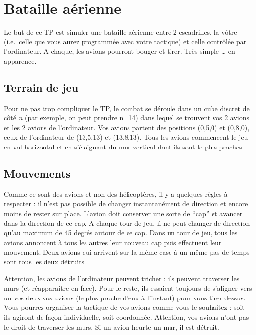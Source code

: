 

\section{Bataille aérienne}\label{bataille-auxe9rienne}

Le but de ce TP est simuler une bataille aérienne entre 2 escadrilles,
la vôtre (i.e.~celle que vous aurez programmée avec votre tactique) et
celle contrôlée par l'ordinateur. A chaque, les avions pourront bouger
et tirer. Très simple \ldots{} en apparence.

\subsection{Terrain de jeu}\label{terrain-de-jeu}

Pour ne pas trop compliquer le TP, le combat se déroule dans un cube
discret de côté \emph{n} (par exemple, on peut prendre n=14) dans lequel
se trouvent vos 2 avions et les 2 avions de l'ordinateur. Vos avions
partent des positions (0,5,0) et (0,8,0), ceux de l'ordinateur de
(13,5,13) et (13,8,13). Tous les avions commencent le jeu en vol
horizontal et en s'éloignant du mur vertical dont ils sont le plus
proches.

\subsection{Mouvements}\label{mouvements}

Comme ce sont des avions et non des hélicoptères, il y a quelques règles à
respecter : il n'est pas possible de changer instantanément de direction
et encore moins de rester sur place. L'avion doit conserver une sorte de
``cap'' et avancer dans la direction de ce cap. A chaque tour de jeu, il
ne peut changer de direction qu'au maximum de 45 degrés autour de ce
cap. Dans un tour de jeu, tous les avions annoncent à tous les autres
leur nouveau cap puis effectuent leur mouvement. Deux avions qui
arrivent sur la même case à un même pas de temps sont tous les deux détruits.

Attention, les avions de l'ordinateur peuvent tricher : ils peuvent traverser les
murs (et réapparaitre en face). Pour le reste, ils essaient toujours de
s'aligner vers un vos deux vos avions (le plus proche d'eux à l'instant) pour
vous tirer dessus. Vous pourrez organiser la tactique de vos avions
comme vous le souhaitez : soit ils agiront de façon individuelle, soit
coordonnée. Attention, vos avions n'ont pas le droit de traverser les
murs. Si un avion heurte un mur, il est détruit.

